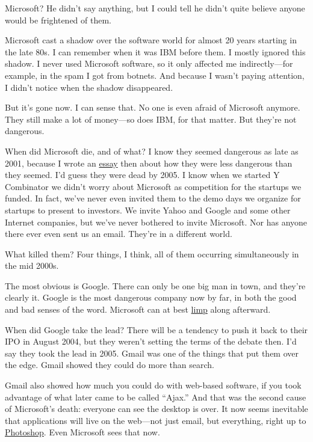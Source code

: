 \documentclass[12pt]{book}
\begin{document}
Microsoft? He didn't say anything, but I could tell he didn't quite
believe anyone would be frightened of them.

Microsoft cast a shadow over the software world for almost 20 years
starting in the late 80s. I can remember when it was IBM before them. I
mostly ignored this shadow. I never used Microsoft software, so it only
affected me indirectly---for example, in the spam I got from botnets.
And because I wasn't paying attention, I didn't notice when the shadow
disappeared.

But it's gone now. I can sense that. No one is even afraid of Microsoft
anymore. They still make a lot of money---so does IBM, for that matter.
But they're not dangerous.

When did Microsoft die, and of what? I know they seemed dangerous as
late as 2001, because I wrote an \href{road.html}{essay} then about how
they were less dangerous than they seemed. I'd guess they were dead by
2005. I know when we started Y Combinator we didn't worry about
Microsoft as competition for the startups we funded. In fact, we've
never even invited them to the demo days we organize for startups to
present to investors. We invite Yahoo and Google and some other Internet
companies, but we've never bothered to invite Microsoft. Nor has anyone
there ever even sent us an email. They're in a different world.

What killed them? Four things, I think, all of them occurring
simultaneously in the mid 2000s.

The most obvious is Google. There can only be one big man in town, and
they're clearly it. Google is the most dangerous company now by far, in
both the good and bad senses of the word. Microsoft can at best
\href{http://live.com}{limp} along afterward.

When did Google take the lead? There will be a tendency to push it back
to their IPO in August 2004, but they weren't setting the terms of the
debate then. I'd say they took the lead in 2005. Gmail was one of the
things that put them over the edge. Gmail showed they could do more than
search.

Gmail also showed how much you could do with web-based software, if you
took advantage of what later came to be called ``Ajax.'' And that was
the second cause of Microsoft's death: everyone can see the desktop is
over. It now seems inevitable that applications will live on the
web---not just email, but everything, right up to
\href{http://snipshot.com}{Photoshop}. Even Microsoft sees that now.
\end{document}
